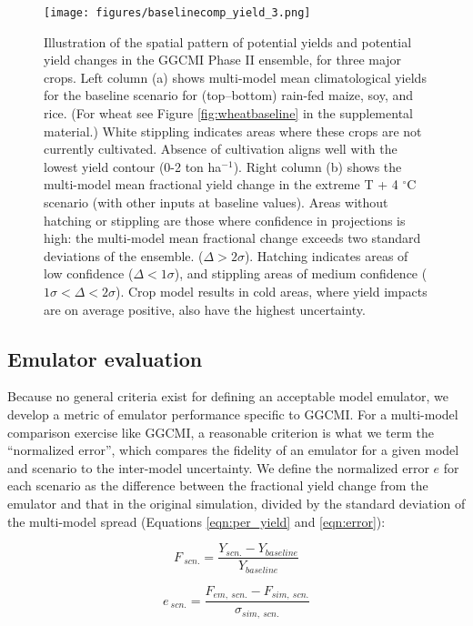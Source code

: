 \documentclass[preprint, 5p, times, twocolumn]{elsarticle}
\begin{document}
{\begin{figure}[!htb]
\centering
   \texttt{[image: figures/baselinecomp\_yield\_3.png]} 
   \caption{Illustration of the spatial pattern of potential yields and potential yield changes in the GGCMI Phase II ensemble, for three major crops. Left column (a) shows multi-model mean climatological yields for the baseline scenario for (top--bottom) rain-fed maize, soy, and rice. (For wheat see Figure \ref{fig:wheatbaseline} in the supplemental material.) White stippling indicates areas where these crops are not currently cultivated. Absence of cultivation aligns well with the lowest yield contour (0-2 ton ha$^{-1}$). Right column (b) shows the multi-model mean fractional yield change in the extreme T + 4 $^{\circ}$C scenario (with other inputs at baseline values). Areas without hatching or stippling are those where confidence in projections is high: the multi-model mean fractional change exceeds two standard deviations of the ensemble. ($\Delta > 2\sigma$). Hatching indicates areas of low confidence ($\Delta < 1 \sigma$), and stippling areas of medium confidence ($1 \sigma < \Delta < 2 \sigma$). Crop model results in cold areas, where yield impacts are on average positive, also have the highest uncertainty.}
   \label{fig:maizesoybaseline}
\end{figure}

\subsection{Emulator evaluation}
Because no general criteria exist for defining an acceptable model emulator, we develop a metric of emulator performance specific to GGCMI. For a multi-model comparison exercise like GGCMI, a reasonable criterion is what we term the ``normalized error'', which compares the fidelity of an emulator for a given model and scenario to the inter-model uncertainty. We define the normalized error $e$ for each scenario as the difference between the fractional yield change from the emulator and that in the original simulation, divided by the standard deviation of the multi-model spread (Equations \ref{eqn:per_yield} and  \ref{eqn:error}):

\begin{equation}
    \label{eqn:per_yield}
    F_{\: scn.}=\frac{Y_{scn.}-Y_{baseline}}{Y_{baseline}}
\end{equation}

\begin{equation}
    \label{eqn:error}
    e_{\: scn.} =\frac{F_{em, \: scn.}-F_{sim, \: scn.}}{\sigma_{sim, \: scn.}}
\end{equation}

}
\end{document}
